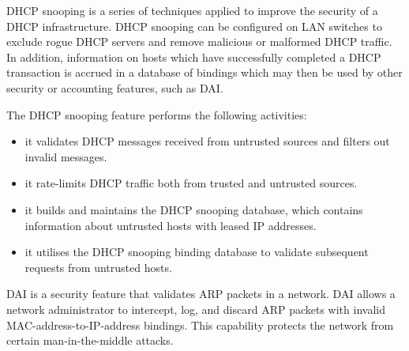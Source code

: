 \ac{DHCP} snooping is a series of techniques applied to improve the security of a \ac{DHCP} infrastructure.
\ac{DHCP} snooping can be configured on \ac{LAN} switches to exclude rogue \ac{DHCP} servers and remove malicious or malformed \ac{DHCP} traffic.
In addition, information on hosts which have successfully completed a \ac{DHCP} transaction is accrued in a database of bindings which may then be used by other security or accounting features, such as \acl{DAI}.

The \ac{DHCP} snooping feature performs the following activities:
\begin{itemize}
\item it validates \acs{DHCP} messages received from untrusted sources and filters out invalid messages.
\item it rate-limits \acs{DHCP} traffic both from trusted and untrusted sources.
\item it builds and maintains the \acs{DHCP} snooping database, which contains information about untrusted hosts with leased \acs{IP} addresses.
\item it utilises the \acs{DHCP} snooping binding database to validate subsequent requests from untrusted hosts.
\end{itemize}

\Acf{DAI} is a security feature that validates \acs{ARP} packets in a network.
\Acl{DAI} allows a network administrator to intercept, log, and discard \ac{ARP} packets with invalid \acs{MAC}-address-to-\acs{IP}-address bindings.
This capability protects the network from certain man-in-the-middle attacks.


